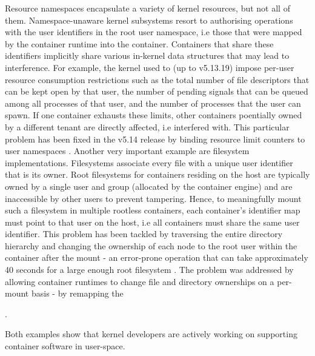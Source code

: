 Resource namespaces encapsulate a variety of kernel resources, but not all of them.
Namespace-unaware kernel subsystems resort to authorising operations with the user identifiers 
in the root user namespace, i.e those that were mapped by the container runtime into the container.
Containers that share these identifiers implicitly share various in-kernel data structures 
that may lead to interference. For example, the kernel used to (up to v5.13.19) impose per-user resource consumption 
restrictions such as the total number of file descriptors that can be kept open by that user, the number of 
pending signals that can be queued among all processes of that user, and the number of processes 
that the user can spawn. If one container exhausts these limits, other containers poentially owned by a different tenant are directly affected, i.e 
interfered with. This particular problem has been fixed in the v5.14 release by binding resource limit counters to user namespaces
\cite{https://patchwork.kernel.org/project/linux-hardening/cover/cover.1619094428.git.legion@kernel.org/}.
Another very important example are filesystem implementations. Filesystems associate every file 
with a unique user identifier that is its owner. Root filesystems for containers residing on the 
host are typically owned by a single user and group (allocated by the container engine) and are inaccessible by other users 
to prevent tampering. Hence, to meaningfully mount such a filesystem in multiple rootless containers, 
each container's identifier map must point to that user on the host, i.e all containers must 
share the same user identifier. This problem has been tackled by traversing the entire directory hierarchy and changing the 
ownership of each node to the root user within the container after the mount - an error-prone operation 
that can take approximately 40 seconds for a large enough root filesystem \cite{https://github.com/containerd/containerd/pull/4734}.
The problem was addressed by allowing container runtimes to change file and directory ownerships on a per-mount basis - by remapping 
the 

\cite{https://lwn.net/Articles/896255/}.

Both examples show that kernel developers are actively working on supporting container software in user-space.
